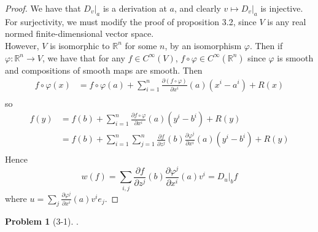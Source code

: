 \documentclass[reqno]{amsart}
\theoremstyle{plain}%
\theoremstyle{definition}
\newtheorem{problem}[theorem]{Problem}
\theoremstyle{remark}
\begin{document}
    \begin{proof}
        We have that $D_{v}|_a$ is a derivation at $a$, and clearly
        $v \mapsto D_v |_a$ is injective.\\
        For surjectivity, we must modify the proof of proposition 3.2, since
        $V$ is any real normed finite-dimensional vector space.\\
        However, $V$ is isomorphic to $\mathbb{R}^{n}$ for some $n$, by an
        isomorphism $\varphi$. Then
        if  $\varphi  \colon \mathbb{R}^{n} \to V$, we have that
        for any $f \in C^{\infty}(V)$,
        $f \circ \varphi \in C^{\infty}(\mathbb{R}^{n})$ since
        $\varphi$ is smooth and compositions of smooth maps are smooth. Then
         \begin{align*}
            f \circ \varphi (x) 
            &= f \circ \varphi(a) +
            \sum_{i=1}^{n} \frac{\partial \left( f \circ \varphi \right) }{
            \partial x^{i}}(a) \left( x^{i} - a^{i} \right) + R(x)\\
        \end{align*}
        so
        \begin{align*}
        f(y) 
        &= f(b) + \sum_{i=1}^{n} \frac{\partial f \circ \varphi}{\partial
        x^{i}}\left( a \right) \left( y^{i} - b^{i} \right) + R(y)\\
        &= f(b) + \sum_{i=1}^{n} \sum_{j=1}^{n}
        \frac{\partial f}{\partial z^{j}} \left( b \right) 
        \frac{\partial \varphi^{j}}{\partial x^{i}}(a) \left( y^{i}-b^{i}
        \right) + R(y)\\
        \end{align*}
        Hence
        \[
        w(f) = \sum_{i,j} \frac{\partial f}{\partial z^{j}}(b) \frac{\partial
        \varphi^{j}}{\partial x^{i}}(a) v^{i}
        = D_{u}|_{b} f
        \] 
        where $u = \sum_j \frac{\partial \varphi^{j}}{\partial x^{i}}(a) v^{i} e_j$.
        
        
    \end{proof}


    \begin{problem}[3-1]
        .
    \end{problem}
\end{document}

